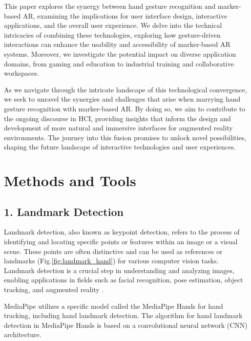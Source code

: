 \documentclass[journal]{IEEEtran}
\begin{document}
This paper explores the synergy between hand gesture recognition and marker-based AR, examining the implications for user interface 
design, interactive applications, and the overall user experience. We delve into the technical intricacies of combining these 
technologies, exploring how gesture-driven interactions can enhance the usability and accessibility of marker-based AR systems. 
Moreover, we investigate the potential impact on diverse application domains, from gaming and education to industrial training and 
collaborative workspaces.

As we navigate through the intricate landscape of this technological convergence, we seek to unravel the synergies and challenges 
that arise when marrying hand gesture recognition with marker-based AR. By doing so, we aim to contribute to the ongoing discourse 
in HCI, providing insights that inform the design and development of more natural and immersive interfaces for augmented reality environments. 
The journey into this fusion promises to unlock novel possibilities, shaping the future landscape of interactive technologies and user experiences.










\section{Methods and Tools}


\subsection*{1. Landmark Detection}
Landmark detection, also known as keypoint detection, refers to the process of identifying and locating specific points or 
features within an image or a visual scene. These points are often distinctive and can be used as references or landmarks (Fig.\ref{fig:landmark_hand})
for various computer vision tasks. Landmark detection \cite{handsegmentation2023} is a crucial step in understanding and analyzing images, enabling applications 
in fields such as facial recognition, pose estimation, object tracking, and augmented reality \cite{lin2021ego2hands}.

MediaPipe utilizes a specific model called the MediaPipe Hands for hand tracking, including hand landmark detection. 
The algorithm for hand landmark detection in MediaPipe Hands is based on a convolutional neural network (CNN) architecture.
\end{document}
